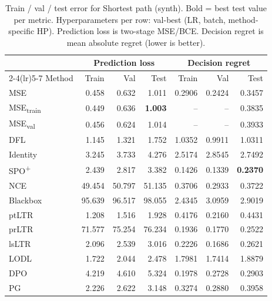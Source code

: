 \begin{table}[t]
\centering
\caption{Train / val / test error for Shortest path (synth). Bold = best test value per metric. Hyperparameters per row: val-best (LR, batch, method-specific HP). Prediction loss is two-stage MSE/BCE. Decision regret is mean absolute regret (lower is better).}
\label{tab:err-sp-synth}
\setlength{\tabcolsep}{4pt}
\renewcommand{\arraystretch}{1.05}
\begin{tabular}{@{}lrrrrrr@{}}
\toprule
& \multicolumn{3}{c}{Prediction loss} & \multicolumn{3}{c}{Decision regret} \\
\cmidrule(lr){2-4}\cmidrule(lr){5-7}
Method & Train & Val & Test & Train & Val & Test \\
\midrule
MSE & 0.458 & 0.632 & 1.011 & 0.2906 & 0.2424 & 0.3457 \\
MSE\textsubscript{train} & 0.449 & 0.636 & \textbf{1.003} & -- & -- & 0.3835 \\
MSE\textsubscript{val} & 0.456 & 0.624 & 1.014 & -- & -- & 0.3933 \\
DFL & 1.145 & 1.321 & 1.752 & 1.0352 & 0.9911 & 1.0311 \\
Identity & 3.245 & 3.733 & 4.276 & 2.5174 & 2.8545 & 2.7492 \\
SPO\textsuperscript{+} & 2.439 & 2.817 & 3.382 & 0.1426 & 0.1339 & \textbf{0.2370} \\
NCE & 49.454 & 50.797 & 51.135 & 0.3706 & 0.2933 & 0.3722 \\
Blackbox & 95.639 & 96.517 & 98.055 & 2.4345 & 3.0959 & 2.9019 \\
ptLTR & 1.208 & 1.516 & 1.928 & 0.4176 & 0.2160 & 0.4431 \\
prLTR & 71.577 & 75.254 & 76.234 & 0.1936 & 0.1770 & 0.2522 \\
lsLTR & 2.096 & 2.539 & 3.016 & 0.2226 & 0.1686 & 0.2621 \\
LODL & 1.722 & 2.044 & 2.478 & 1.7981 & 1.7414 & 1.8879 \\
DPO & 4.219 & 4.610 & 5.324 & 0.1978 & 0.2728 & 0.2903 \\
PG & 2.226 & 2.622 & 3.148 & 0.3274 & 0.2880 & 0.3958 \\
\bottomrule
\end{tabular}
\end{table}

